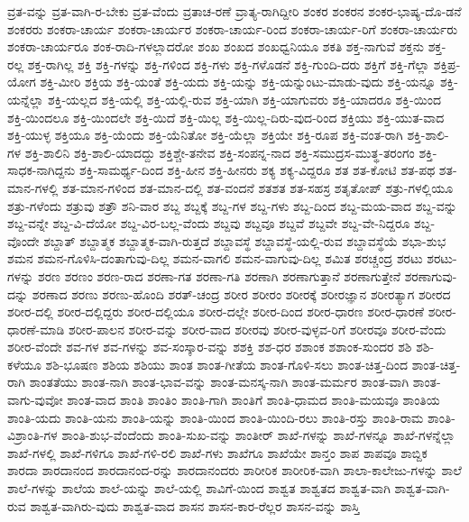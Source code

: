 {ವ್ರತ-ವನ್ನು
ವ್ರತ-ವಾಗಿ-ರ-ಬೇಕು
ವ್ರತ-ವೆಂದು
ವ್ರತಾಚ-ರಣೆ
ವ್ರಾತ್ಯ-ರಾಗಿದ್ದೀರಿ
ಶಂಕರ
ಶಂಕರನ
ಶಂಕರ-ಭಾಷ್ಯ-ದೊ-ಡನೆ
ಶಂಕರರು
ಶಂಕರಾ-ಚಾರ್ಯ
ಶಂಕರಾ-ಚಾರ್ಯರ
ಶಂಕರಾ-ಚಾರ್ಯ-ರಿಂದ
ಶಂಕರಾ-ಚಾರ್ಯ-ರಿಗೆ
ಶಂಕರಾ-ಚಾರ್ಯರು
ಶಂಕರಾ-ಚಾರ್ಯರೂ
ಶಂಕ-ರಾದಿ-ಗಳಲ್ಲಾದರೋ
ಶಂಖ
ಶಂಖದ
ಶಂಖಧ್ವನಿಯೂ
ಶಕತಿ
ಶಕ್ತ-ನಾಗುವೆ
ಶಕ್ತನು
ಶಕ್ತ-ರಲ್ಲ
ಶಕ್ತ-ರಾಗಿಲ್ಲ
ಶಕ್ತಿ
ಶಕ್ತಿ-ಗಳನ್ನು
ಶಕ್ತಿ-ಗಳಿಂದ
ಶಕ್ತಿ-ಗಳು
ಶಕ್ತಿ-ಗಳೊಡನೆ
ಶಕ್ತಿ-ಗುಂದಿ-ದರು
ಶಕ್ತಿಗೆ
ಶಕ್ತಿ-ಗೆಲ್ಲಾ
ಶಕ್ತಿಪ್ರ-ಯೋಗ
ಶಕ್ತಿ-ಮೀರಿ
ಶಕ್ತಿಯ
ಶಕ್ತಿ-ಯಂತೆ
ಶಕ್ತಿ-ಯದು
ಶಕ್ತಿ-ಯನ್ನು
ಶಕ್ತಿ-ಯನ್ನುಂಟು-ಮಾಡು-ವುದು
ಶಕ್ತಿ-ಯನ್ನೂ
ಶಕ್ತಿ-ಯನ್ನೆಲ್ಲಾ
ಶಕ್ತಿ-ಯಲ್ಲದ
ಶಕ್ತಿ-ಯಲ್ಲಿ
ಶಕ್ತಿ-ಯಲ್ಲಿ-ರುವ
ಶಕ್ತಿ-ಯಾಗಿ
ಶಕ್ತಿ-ಯಾಗುವರು
ಶಕ್ತಿ-ಯಾದರೂ
ಶಕ್ತಿ-ಯಿಂದ
ಶಕ್ತಿ-ಯಿಂದಲೂ
ಶಕ್ತಿ-ಯಿಂದಲೇ
ಶಕ್ತಿ-ಯಿದೆ
ಶಕ್ತಿ-ಯಿಲ್ಲ
ಶಕ್ತಿ-ಯಿಲ್ಲ-ದಿರು-ವುದ-ರಿಂದ
ಶಕ್ತಿಯು
ಶಕ್ತಿ-ಯುತ-ವಾದ
ಶಕ್ತಿ-ಯುಳ್ಳ
ಶಕ್ತಿಯೂ
ಶಕ್ತಿ-ಯೆಂದು
ಶಕ್ತಿ-ಯೆನಿತೋ
ಶಕ್ತಿ-ಯೆಲ್ಲಾ
ಶಕ್ತಿಯೇ
ಶಕ್ತಿ-ರೂಪ
ಶಕ್ತಿ-ವಂತ-ರಾಗಿ
ಶಕ್ತಿ-ಶಾಲಿ-ಗಳ
ಶಕ್ತಿ-ಶಾಲಿನಿ
ಶಕ್ತಿ-ಶಾಲಿ-ಯಾದದ್ದು
ಶಕ್ತಿಶ್ಚೇ-ತನೇವ
ಶಕ್ತಿ-ಸಂಪನ್ನ-ನಾದ
ಶಕ್ತಿ-ಸಮುದ್ರಸ-ಮುತ್ಥ-ತರಂಗಂ
ಶಕ್ತಿ-ಸಾಧಕ-ನಾಗಿದ್ದನು
ಶಕ್ತಿ-ಸಾಮರ್ಥ್ಯ-ದಿಂದ
ಶಕ್ತಿ-ಹೀನ
ಶಕ್ತಿ-ಹೀನರು
ಶಕ್ಯ
ಶಕ್ಯ-ವಿದ್ದರೂ
ಶತ
ಶತ-ಕೋಟಿ
ಶತ-ಪಥ
ಶತ-ಮಾನ-ಗಳಲ್ಲಿ
ಶತ-ಮಾನ-ಗಳಿಂದ
ಶತ-ಮಾನ-ದಲ್ಲಿ
ಶತ-ವಂದನೆ
ಶತಶತ
ಶತ-ಸಹಸ್ರ
ಶತೃತೋಪ್
ಶತ್ರು-ಗಳಲ್ಲಿಯೂ
ಶತ್ರು-ಗಳೆಂದು
ಶತ್ರುವು
ಶತ್ರೌ
ಶನಿ-ವಾರ
ಶಬ್ದ
ಶಬ್ದಕ್ಕೆ
ಶಬ್ದ-ಗಳ
ಶಬ್ದ-ಗಳು
ಶಬ್ದ-ದಿಂದ
ಶಬ್ದ-ಮಯ-ವಾದ
ಶಬ್ದ-ವನ್ನು
ಶಬ್ದ-ವನ್ನೇ
ಶಬ್ದ-ವಿ-ದೆಯೋ
ಶಬ್ದ-ವಿರ-ಬಲ್ಲ-ವೆಂದು
ಶಬ್ದವು
ಶಬ್ದವೂ
ಶಬ್ದವೆ
ಶಬ್ದವೇ
ಶಬ್ದ-ವೇ-ನಿದ್ದರೂ
ಶಬ್ದ-ವೊಂದೇ
ಶಬ್ದಾತ್
ಶಬ್ದಾತ್ಮಕ
ಶಬ್ದಾತ್ಮಕ-ವಾಗಿ-ರುತ್ತದೆ
ಶಬ್ದಾವಸ್ಥೆ
ಶಬ್ದಾವಸ್ಥೆ-ಯಲ್ಲಿ-ರುವ
ಶಬ್ದಾವಸ್ಥೆಯೆ
ಶಭಾ-ಶುಭ
ಶಮನ
ಶಮನ-ಗೊಳಿಸಿ-ದಂತಾಗುವು-ದಿಲ್ಲ
ಶಮನ-ವಾಗಲಿ
ಶಮನ-ವಾಗುವು-ದಿಲ್ಲ
ಶಮಿತ
ಶರಚ್ಚಂದ್ರ
ಶರಟು
ಶರಟು-ಗಳನ್ನು
ಶರಣ
ಶರಣಂ
ಶರಣ-ರಾದ
ಶರಣಾ-ಗತ
ಶರಣಾ-ಗತಿ
ಶರಣಾಗಿ
ಶರಣಾಗುತ್ತಾನೆ
ಶರಣಾಗುತ್ತೇನೆ
ಶರಣಾಗುವು-ದನ್ನು
ಶರಣಾದ
ಶರಣು
ಶರಣು-ಹೊಂದಿ
ಶರತ್-ಚಂದ್ರ
ಶರೀರ
ಶರೀರಂ
ಶರೀರಕ್ಕೆ
ಶರೀರಜ್ಞಾನ
ಶರೀರತ್ಯಾಗ
ಶರೀರದ
ಶರೀರ-ದಲ್ಲಿ
ಶರೀರ-ದಲ್ಲಿದ್ದರು
ಶರೀರ-ದಲ್ಲಿಯೂ
ಶರೀರ-ದಲ್ಲೇ
ಶರೀರ-ದಿಂದ
ಶರೀರ-ಧಾರಣ
ಶರೀರ-ಧಾರಣೆ
ಶರೀರ-ಧಾರಣೆ-ಮಾಡಿ
ಶರೀರ-ಪಾಲನ
ಶರೀರ-ವನ್ನು
ಶರೀರ-ವಾದ
ಶರೀರವು
ಶರೀರ-ವುಳ್ಳವ-ರಿಗೆ
ಶರೀರವೂ
ಶರೀರ-ವೆಂದು
ಶರೀರ-ವೆಂದೇ
ಶವ-ಗಳ
ಶವ-ಗಳನ್ನು
ಶವ-ಸಂಸ್ಕಾರ-ವನ್ನು
ಶಶಕ್ತಿ
ಶಶ-ಧರ
ಶಶಾಂಕ
ಶಶಾಂಕ-ಸುಂದರ
ಶಶಿ
ಶಶಿ-ಕಳೆಯೂ
ಶಶಿ-ಭೂಷಣ
ಶಶಿಯ
ಶಶಿಯು
ಶಾಂತ
ಶಾಂತ-ಗೀತೆಯ
ಶಾಂತ-ಗೊಳಿ-ಸಲು
ಶಾಂತ-ಚಿತ್ತ-ದಿಂದ
ಶಾಂತ-ಚಿತ್ತ-ರಾಗಿ
ಶಾಂತತೆಯು
ಶಾಂತ-ನಾಗಿ
ಶಾಂತ-ಭಾವ-ವನ್ನು
ಶಾಂತ-ಮನಸ್ಕ-ನಾಗಿ
ಶಾಂತ-ಮರ್ಮರ
ಶಾಂತ-ವಾಗಿ
ಶಾಂತ-ವಾಗು-ವುವೋ
ಶಾಂತ-ವಾದ
ಶಾಂತಿ
ಶಾಂತಿಂ
ಶಾಂತಿ-ಗಾಗಿ
ಶಾಂತಿಗೆ
ಶಾಂತಿ-ಧಾಮದ
ಶಾಂತಿ-ಮಯವೂ
ಶಾಂತಿಯ
ಶಾಂತಿ-ಯದು
ಶಾಂತಿ-ಯನು
ಶಾಂತಿ-ಯನ್ನು
ಶಾಂತಿ-ಯಿಂದ
ಶಾಂತಿ-ಯಿಂದಿ-ರಲು
ಶಾಂತಿ-ರಸ್ತು
ಶಾಂತಿ-ರಾಮ
ಶಾಂತಿ-ವಿಶ್ರಾಂತಿ-ಗಳ
ಶಾಂತಿ-ಶುಭ-ವೆಂದೆಂದು
ಶಾಂತಿ-ಸುಖ-ವನ್ನು
ಶಾಂತೀರ್
ಶಾಖೆ-ಗಳನ್ನು
ಶಾಖೆ-ಗಳನ್ನೂ
ಶಾಖೆ-ಗಳನ್ನೆಲ್ಲಾ
ಶಾಖೆ-ಗಳಲ್ಲಿ
ಶಾಖೆ-ಗಳಿಗೂ
ಶಾಖೆ-ಗಳಿ-ರಲಿ
ಶಾಖೆ-ಗಳು
ಶಾಖೆಗೂ
ಶಾಖೆಯೇ
ಶಾನ್ತಂ
ಶಾಪ
ಶಾಪವೂ
ಶಾಬ್ದಿಕ
ಶಾರದಾ
ಶಾರದಾನಂದ
ಶಾರದಾನಂದ-ರನ್ನು
ಶಾರದಾನಂದರು
ಶಾರೀರಿಕ
ಶಾರೀರಿಕ-ವಾಗಿ
ಶಾಲಾ-ಕಾಲೇಜು-ಗಳನ್ನು
ಶಾಲೆ
ಶಾಲೆ-ಗಳನ್ನು
ಶಾಲೆಯ
ಶಾಲೆ-ಯನ್ನು
ಶಾಲೆ-ಯಲ್ಲಿ
ಶಾವಿಗೆ-ಯಿಂದ
ಶಾಶ್ವತ
ಶಾಶ್ವತದ
ಶಾಶ್ವತ-ವಾಗಿ
ಶಾಶ್ವತ-ವಾಗಿ-ರುವ
ಶಾಶ್ವತ-ವಾಗಿರು-ವುದು
ಶಾಶ್ವತ-ವಾದ
ಶಾಸನ
ಶಾಸನ-ಕಾರ-ರೆಲ್ಲರ
ಶಾಸನ-ವನ್ನು
ಶಾಸ್ತಿ
}

